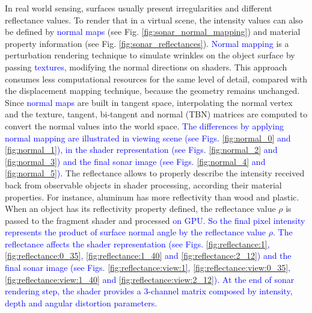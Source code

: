 \documentclass[final,5p,times]{elsarticle}
\begin{document}
In real world sensing, surfaces usually present irregularities
and different reflectance values. To render that in a virtual scene, the
intensity values can also be defined by \textcolor{blue}{normal maps} (see Fig. \ref{fig:sonar_normal_mapping}) and material property information (see Fig. \ref{fig:sonar_reflectances}). \textcolor{blue}{Normal mapping} is a perturbation rendering technique to simulate wrinkles on the object surface by passing \textcolor{blue}{textures}, modifying
the normal directions on shaders. This approach consumes less computational
resources for the same level of detail, compared with the displacement mapping
technique, because the geometry remains unchanged. Since \textcolor{blue}{normal maps} are built in tangent space, interpolating the normal vertex and the texture, tangent, bi-tangent and normal (TBN) matrices are computed to convert the normal values into the world space. \textcolor{blue}{The differences by applying normal mapping are illustrated in viewing scene (see Figs. \ref{fig:normal_0} and \ref{fig:normal_1}), in the shader representation (see Figs. \ref{fig:normal_2} and \ref{fig:normal_3}) and the final sonar image (see Figs. \ref{fig:normal_4} and \ref{fig:normal_5})}. The reflectance allows to properly describe the intensity received back
from observable objects in shader processing, according their material
properties. For instance, aluminum has more reflectivity than wood and plastic.
When an object has its reflectivity property defined, the reflectance value
$\rho$ is passed to the fragment shader and processed \textcolor{blue}{on GPU. So the final
pixel intensity represents the product of surface normal angle by the reflectance
value $\rho$. The reflectance affects the shader representation (see Figs. \ref{fig:reflectance:1}, \ref{fig:reflectance:0_35}, \ref{fig:reflectance:1_40} and \ref{fig:reflectance:2_12}) and the final sonar image (see Figs. \ref{fig:reflectance:view:1}, \ref{fig:reflectance:view:0_35}, \ref{fig:reflectance:view:1_40} and \ref{fig:reflectance:view:2_12}).
At the end of sonar rendering step, the shader provides a 3-channel matrix composed by intensity, depth and angular
distortion parameters.}
\end{document}
